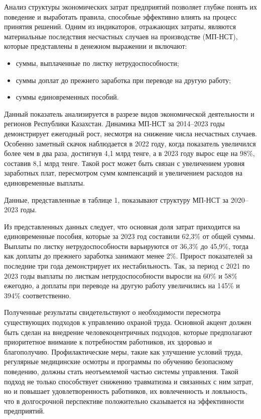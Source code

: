 \begin{multicols}{2}


Анализ структуры экономических затрат предприятий позволяет глубже
понять их поведение и выработать правила, способные эффективно влиять на
процесс принятия решений. Одним из индикаторов, отражающих затраты,
являются материальные последствия несчастных случаев на производстве
(МП-НСТ), которые представлены в денежном выражении и включают:

\begin{itemize}
\item
  суммы, выплаченные по листку нетрудоспособности;
\item
  суммы доплат до прежнего заработка при переводе на другую работу;
\item
  суммы единовременных пособий.
\end{itemize}

Данный показатель анализируется в разрезе видов экономической
деятельности и регионов Республики Казахстан. Динамика МП-НСТ за
2014--2023 годы демонстрирует ежегодный рост, несмотря на снижение числа
несчастных случаев. Особенно заметный скачок наблюдается в 2022 году,
когда показатель увеличился более чем в два раза, достигнув 4,1 млрд
тенге, а в 2023 году вырос еще на 98\%, составив 8,1 млрд тенге. Такой
рост может быть связан с увеличением уровня заработных плат, пересмотром
сумм компенсаций и увеличением расходов на единовременные выплаты.

Данные, представленные в таблице 1, показывают структуру МП-НСТ за
2020--2023 годы.


Из представленных данных следует, что основная доля затрат приходится на
единовременные пособия, которые за 2023 год составили 62,3\% от общей
суммы. Выплаты по листку нетрудоспособности варьируются от 36,3\% до
45,9\%, тогда как доплаты до прежнего заработка занимают менее 2\%.
Прирост показателей за последние три года демонстрирует их
нестабильность. Так, за период с 2021 по 2023 годы выплаты по листкам
нетрудоспособности выросли на 60\% и 58\% ежегодно, а доплаты при
переводе на другую работу увеличились на 145\% и 394\% соответственно.


Полученные результаты свидетельствуют о необходимости пересмотра
существующих подходов к управлению охраной труда. Основной акцент должен
быть сделан на внедрение человекоцентричных подходов, которые
предполагают приоритетное внимание к потребностям работников, их
здоровью и благополучию. Профилактические меры, такие как улучшение
условий труда, регулярные медицинские осмотры и программы по обучению
безопасному поведению, должны стать неотъемлемой частью системы
управления. Такой подход не только способствует снижению травматизма и
связанных с ним затрат, но и повышает удовлетворенность работников, их
вовлеченность и лояльность, что в долгосрочной перспективе положительно
сказывается на эффективности предприятий.
\end{multicols}


